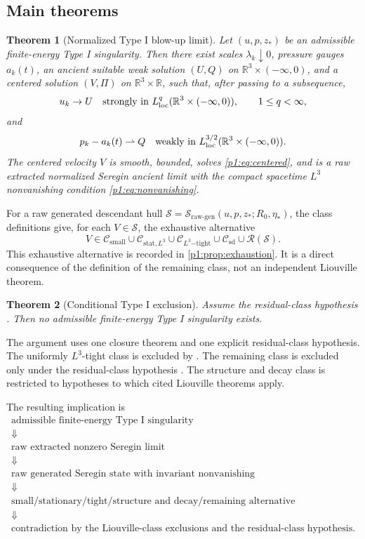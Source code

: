 \documentclass[11pt]{amsart}
\theoremstyle{plain}
\newtheorem{theorem}{Theorem}[section]
\theoremstyle{definition}
\theoremstyle{remark}
\numberwithin{equation}{section}
\newcommand{\R}{\mathbb R}
\newcommand{\loc}{\mathrm{loc}}
\newcommand{\calS}{\mathcal S}
\newcommand{\calR}{\mathcal R}
\newcommand{\calC}{\mathcal C}
\begin{document}
\subsection{Main theorems}

\begin{theorem}[Normalized Type I blow-up limit]\label{p1:thm:extraction}
Let \((u,p,z_*)\) be an admissible finite-energy Type I singularity.  Then
there exist scales \(\lambda_k\downarrow0\), pressure gauges \(a_k(t)\), an
ancient suitable weak solution \((U,Q)\) on
\(\R^3\times(-\infty,0)\), and a centered solution \((V,\Pi)\) on
\(\R^3\times\R\), such that, after passing to a subsequence,
\[
   u_k\to U
   \quad\hbox{strongly in }L^q_{\loc}(\R^3\times(-\infty,0)),
   \qquad 1\le q<\infty,
\]
and
\[
   p_k-a_k(t)\rightharpoonup Q
   \quad\hbox{weakly in }L^{3/2}_{\loc}(\R^3\times(-\infty,0)).
\]
The centered velocity \(V\) is smooth, bounded, solves \eqref{p1:eq:centered},
and is a raw extracted normalized Seregin ancient limit with the compact
spacetime \(L^3\) nonvanishing condition \eqref{p1:eq:nonvanishing}.
\end{theorem}

For a raw generated descendant hull
\(\calS=\calS_{\mathrm{raw\text{-}gen}}(u,p,z_*;R_0,\eta_*)\), the class definitions give, for
each \(V\in\calS\), the exhaustive alternative
\[
   V\in
   \calC_{\mathrm{small}}
   \cup
   \calC_{\mathrm{stat},L^3}
   \cup
   \calC_{L^3\mathrm{-tight}}
   \cup
   \calC_{\mathrm{sd}}
   \cup
   \calR(\calS).
\]
This exhaustive alternative is recorded in \cref{p1:prop:exhaustion}.  It is a
direct consequence of the definition of the remaining class, not an
independent Liouville theorem.

\begin{theorem}[Conditional Type I exclusion]
\label{p1:thm:remaining-criterion}
Assume the residual-class hypothesis .  Then no
admissible finite-energy Type I singularity exists.
\end{theorem}

The argument uses one closure theorem and one explicit residual-class
hypothesis.  The uniformly \(L^3\)-tight class is excluded by
.
The remaining class is excluded only under the residual-class hypothesis
.  The structure and decay
class is restricted to hypotheses to which cited Liouville theorems apply.

The resulting implication is
\[
\begin{array}{c}
\text{admissible finite-energy Type I singularity}
\\
\Downarrow
\\
\text{raw extracted nonzero Seregin limit}
\\
\Downarrow
\\
\text{raw generated Seregin state with invariant nonvanishing}
\\
\Downarrow
\\
\text{small/stationary/tight/structure and decay/remaining alternative}
\\
\Downarrow
\\
\text{contradiction by the Liouville-class exclusions and the residual-class hypothesis.}
\end{array}
\]
\end{document}
